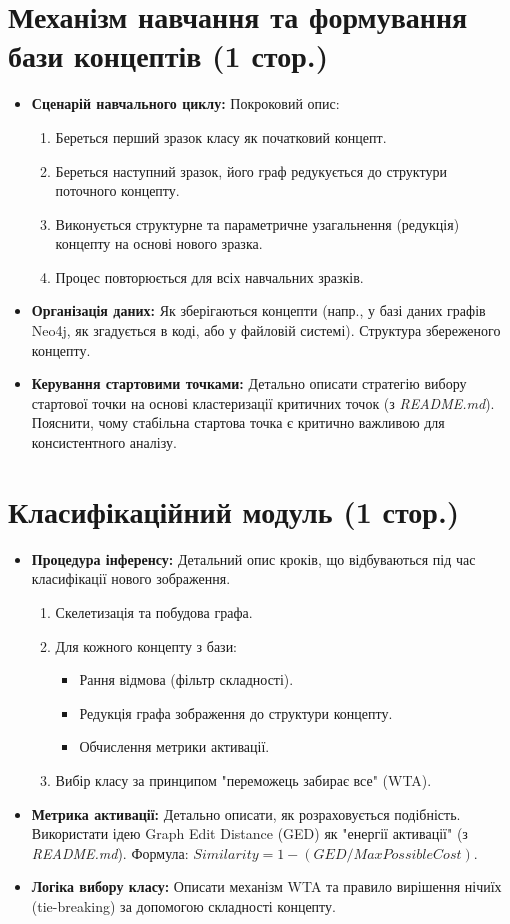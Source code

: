 \documentclass[12pt, a4paper]{article}
\begin{document}
\section{Механізм навчання та формування бази концептів (1 стор.)}
\begin{itemize}
    \item \textbf{Сценарій навчального циклу:} Покроковий опис:
    \begin{enumerate}
        \item Береться перший зразок класу як початковий концепт.
        \item Береться наступний зразок, його граф редукується до структури поточного концепту.
        \item Виконується структурне та параметричне узагальнення (редукція) концепту на основі нового зразка.
        \item Процес повторюється для всіх навчальних зразків.
    \end{enumerate}
    \item \textbf{Організація даних:} Як зберігаються концепти (напр., у базі даних графів Neo4j, як згадується в коді, або у файловій системі). Структура збереженого концепту.
    \item \textbf{Керування стартовими точками:} Детально описати стратегію вибору стартової точки на основі кластеризації критичних точок (з \textit{README.md}). Пояснити, чому стабільна стартова точка є критично важливою для консистентного аналізу.
\end{itemize}

\section{Класифікаційний модуль (1 стор.)}
\begin{itemize}
    \item \textbf{Процедура інференсу:} Детальний опис кроків, що відбуваються під час класифікації нового зображення.
    \begin{enumerate}
        \item Скелетизація та побудова графа.
        \item Для кожного концепту з бази:
        \begin{itemize}
            \item Рання відмова (фільтр складності).
            \item Редукція графа зображення до структури концепту.
            \item Обчислення метрики активації.
        \end{itemize}
        \item Вибір класу за принципом "переможець забирає все" (WTA).
    \end{enumerate}
    \item \textbf{Метрика активації:} Детально описати, як розраховується подібність. Використати ідею Graph Edit Distance (GED) як "енергії активації" (з \textit{README.md}). Формула: $Similarity = 1 - (GED / MaxPossibleCost)$.
    \item \textbf{Логіка вибору класу:} Описати механізм WTA та правило вирішення нічиїх (tie-breaking) за допомогою складності концепту.
\end{itemize}
\end{document}
